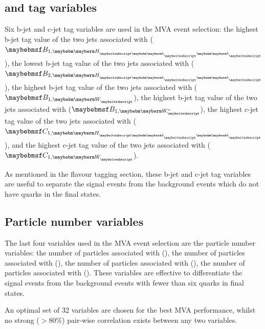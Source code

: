\subsection{\Pbottom and \Pcharm tag  variables}

Six b-jet and c-jet tag variables are used in the MVA event selection: the highest b-jet tag value of the two jets associated with \Hbb ($\btagFull{1,\Hbb}$), the lowest b-jet tag value of the two jets associated with \Hbb ($\btagFull{2,\Hbb}$), the highest b-jet tag value of the two jets associated with \PW ($\btagFull{1,\PW}$), the highest b-jet tag value of the two jets associated with \W* ($\btagFull{1,\W*}$), the highest c-jet tag value of the two jets associated with \Hbb ($\ctagFull{1,\Hbb}$), and the highest c-jet tag value of the two jets associated with \PW ($\ctagFull{1,\PW}$).

As mentioned in the flavour tagging section, these b-jet and c-jet tag variables are useful to separate the signal events from the background events which do not have \Pbottom quarks in the final states.

\subsection{Particle number  variables}

The last four variables used in the MVA event selection are the particle number  variables: the number of particles associated with \Hbb (\Hbb), the number of particles associated with \HWW (\HWW), the number of particles associated with \PW (\PW), the number of particles associated with \W* (\W*). These variables are effective to differentiate the signal events from the background events with fewer than six quarks in final states.

An optimal set of 32 variables are chosen for the best MVA performance, whilst no strong ($>80\%$) pair-wise correlation exists between any two variables. %

